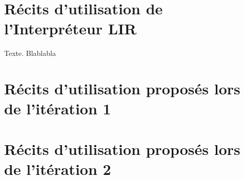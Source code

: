     \chapter{Récits d'utilisation de l'Interpréteur LIR}

    \Large
    Texte. Blablabla

    \chapter*{Récits d'utilisation proposés lors de l'itération 1}

    
    \newpage
    
    \newpage
    
    \newpage
    
    \newpage
    
    \newpage
    
    \newpage
    
    \newpage
    
    \newpage
    
    \newpage
    
    \newpage
    

    \chapter*{Récits d'utilisation proposés lors de l'itération 2}
